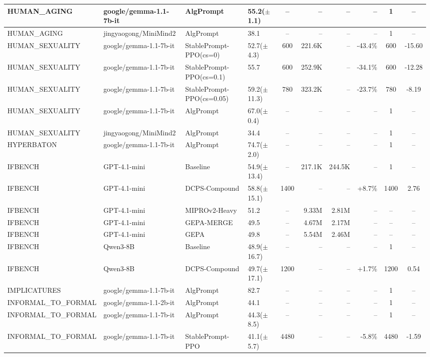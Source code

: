 {\begin{longtable}{@{}p{5.5cm}p{4.5cm}p{2.5cm}lcrrrcc@{}}
HUMAN\_AGING & google/gemma-1.1-7b-it & AlgPrompt & 55.2($\pm$1.1) & -- & -- & -- & -- & 1 & -- \\
\midrule
HUMAN\_AGING & jingyaogong/MiniMind2 & AlgPrompt & 38.1 & -- & -- & -- & -- & 1 & -- \\
\midrule
HUMAN\_SEXUALITY & google/gemma-1.1-7b-it & StablePrompt-PPO(cs=0) & 52.7($\pm$4.3) & 600 & 221.6K & -- & -43.4\% & 600 & -15.60 \\
HUMAN\_SEXUALITY & google/gemma-1.1-7b-it & StablePrompt-PPO(cs=0.1) & 55.7 & 600 & 252.9K & -- & -34.1\% & 600 & -12.28 \\
HUMAN\_SEXUALITY & google/gemma-1.1-7b-it & StablePrompt-PPO(cs=0.05) & 59.2($\pm$11.3) & 780 & 323.2K & -- & -23.7\% & 780 & -8.19 \\
HUMAN\_SEXUALITY & google/gemma-1.1-7b-it & AlgPrompt & 67.0($\pm$0.4) & -- & -- & -- & -- & 1 & -- \\
\midrule
HUMAN\_SEXUALITY & jingyaogong/MiniMind2 & AlgPrompt & 34.4 & -- & -- & -- & -- & 1 & -- \\
\midrule
HYPERBATON & google/gemma-1.1-7b-it & AlgPrompt & 74.7($\pm$2.0) & -- & -- & -- & -- & 1 & -- \\
\midrule
IFBENCH & GPT-4.1-mini & Baseline & 54.9($\pm$13.4) & -- & 217.1K & 244.5K & -- & 1 & -- \\
IFBENCH & GPT-4.1-mini & DCPS-Compound & 58.8($\pm$15.1) & 1400 & -- & -- & +8.7\% & 1400 & 2.76 \\
IFBENCH & GPT-4.1-mini & MIPROv2-Heavy & 51.2 & -- & 9.33M & 2.81M & -- & -- & -- \\
IFBENCH & GPT-4.1-mini & GEPA-MERGE & 49.5 & -- & 4.67M & 2.17M & -- & -- & -- \\
IFBENCH & GPT-4.1-mini & GEPA & 49.8 & -- & 5.54M & 2.46M & -- & -- & -- \\
\midrule
IFBENCH & Qwen3-8B & Baseline & 48.9($\pm$16.7) & -- & -- & -- & -- & 1 & -- \\
IFBENCH & Qwen3-8B & DCPS-Compound & 49.7($\pm$17.1) & 1200 & -- & -- & +1.7\% & 1200 & 0.54 \\
\midrule
IMPLICATURES & google/gemma-1.1-7b-it & AlgPrompt & 82.7 & -- & -- & -- & -- & 1 & -- \\
\midrule
INFORMAL\_TO\_FORMAL & google/gemma-1.1-2b-it & AlgPrompt & 44.1 & -- & -- & -- & -- & 1 & -- \\
\midrule
INFORMAL\_TO\_FORMAL & google/gemma-1.1-7b-it & AlgPrompt & 44.3($\pm$8.5) & -- & -- & -- & -- & 1 & -- \\
INFORMAL\_TO\_FORMAL & google/gemma-1.1-7b-it & StablePrompt-PPO & 41.1($\pm$5.7) & 4480 & -- & -- & -5.8\% & 4480 & -1.59 \\

\end{longtable}}
